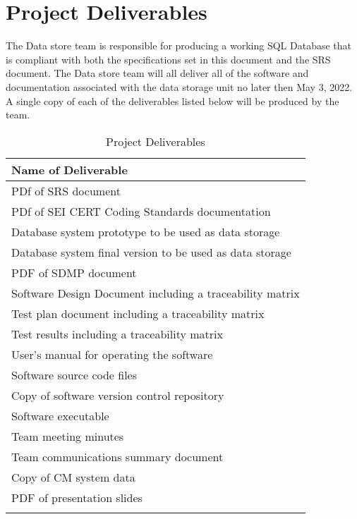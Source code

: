 \documentclass[letterpaper,12pt,oneside,listof=totoc]{scrreprt}
\begin{document}
\section{Project Deliverables} %
The Data store team is responsible for producing a working SQL Database that is compliant with both the specifications set in this document and the SRS document.
The Data store team will all deliver all of the software and documentation associated with the data storage unit no later then May 3, 2022. A single copy of each of the deliverables listed below will be produced by the team.

\begin{longtable}{|p{}|} 
    \hline
    \textbf{Name of Deliverable} \\
    \hline
    PDf of SRS document \\ 
    \hline
    PDf of SEI CERT Coding Standards documentation \\ 
    \hline
    Database system prototype to be used as data storage\\ 
    \hline
    Database system final version to be used as data storage\\ 
    \hline
    PDF of SDMP document \\ 
    \hline
    Software Design Document including a traceability matrix \\
    \hline
    Test plan document including a traceability matrix \\
    \hline
    Test results including a traceability matrix \\
    \hline
    User's manual for operating the software \\
    \hline 
    Software source code files \\
    \hline
    Copy of software version control repository \\
    \hline 
    Software executable \\
    \hline
    Team meeting minutes \\
    \hline
    Team communications summary document\\
    \hline 
    Copy of CM system data\\
    \hline
    PDF of presentation slides \\
    \hline 
\caption{Project Deliverables}
\end{longtable}
\end{document}
